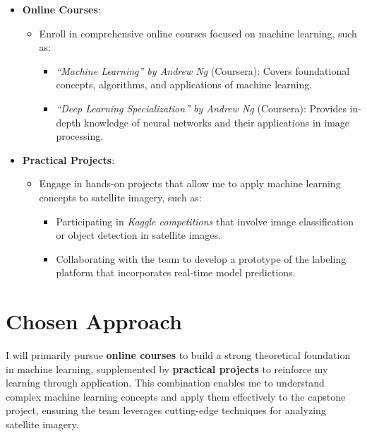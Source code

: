\documentclass[12pt]{article}
\begin{document}
\begin{itemize}
    \item \textbf{Online Courses}:
    \begin{itemize}
        \item Enroll in comprehensive online courses focused on machine learning, such as:
        \begin{itemize}
            \item \textit{“Machine Learning” by Andrew Ng} (Coursera): Covers foundational concepts, algorithms, and applications of machine learning.
            \item \textit{“Deep Learning Specialization” by Andrew Ng} (Coursera): Provides in-depth knowledge of neural networks and their applications in image processing.
        \end{itemize}
    \end{itemize}
    
    \item \textbf{Practical Projects}:
    \begin{itemize}
        \item Engage in hands-on projects that allow me to apply machine learning concepts to satellite imagery, such as:
        \begin{itemize}
            \item Participating in \textit{Kaggle competitions} that involve image classification or object detection in satellite images.
            \item Collaborating with the team to develop a prototype of the labeling platform that incorporates real-time model predictions.
        \end{itemize}
    \end{itemize}
\end{itemize}

\section{Chosen Approach}

I will primarily pursue \textbf{online courses} to build a strong theoretical foundation in machine learning, supplemented by \textbf{practical projects} to reinforce my learning through application. This combination enables me to understand complex machine learning concepts and apply them effectively to the capstone project, ensuring the team leverages cutting-edge techniques for analyzing satellite imagery.
\end{document}
